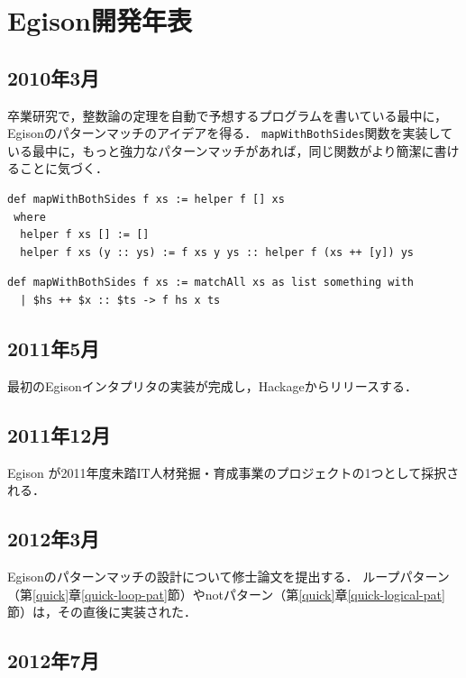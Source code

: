 \chapter{Egison開発年表}

\section*{2010年3月}

卒業研究で，整数論の定理を自動で予想するプログラムを書いている最中に，Egisonのパターンマッチのアイデアを得る．
\lstinline{mapWithBothSides}関数を実装している最中に，もっと強力なパターンマッチがあれば，同じ関数がより簡潔に書けることに気づく．
\begin{lstlisting}[language=egison,numbers=none]
def mapWithBothSides f xs := helper f [] xs
 where
  helper f xs [] := []
  helper f xs (y :: ys) := f xs y ys :: helper f (xs ++ [y]) ys
\end{lstlisting}
\begin{lstlisting}[language=egison,numbers=none]
def mapWithBothSides f xs := matchAll xs as list something with
  | $hs ++ $x :: $ts -> f hs x ts
\end{lstlisting}

\section*{2011年5月}

最初のEgisonインタプリタの実装が完成し，Hackageからリリースする．

\section*{2011年12月}

Egison が2011年度未踏IT人材発掘・育成事業のプロジェクトの1つとして採択される．

\section*{2012年3月}

Egisonのパターンマッチの設計について修士論文を提出する．
ループパターン（第\ref{quick}章\ref{quick-loop-pat}節）やnotパターン（第\ref{quick}章\ref{quick-logical-pat}節）は，その直後に実装された．

\section*{2012年7月}

